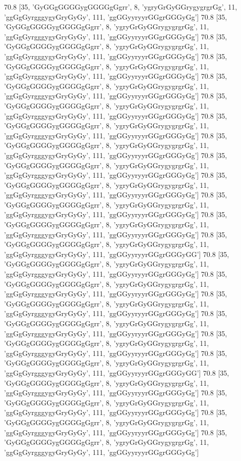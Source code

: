 70.8 [35, 'GyGGgGGGGygGGGGgGgrr', 8, 'ygryGrGyGGrygygrgrGg', 11, 'ggGgGyrgggygyGryGyGy', 111, 'ggGGyyryyrGGgrGGGyGg']
70.8 [35, 'GyGGgGGGGygGGGGgGgrr', 8, 'ygryGrGyGGrygygrgrGg', 11, 'ggGgGyrgggygyGryGyGy', 111, 'ggGGyyryyrGGgrGGGyGg']
70.8 [35, 'GyGGgGGGGygGGGGgGgrr', 8, 'ygryGrGyGGrygygrgrGg', 11, 'ggGgGyrgggygyGryGyGy', 111, 'ggGGyyryyrGGgrGGGyGg']
70.8 [35, 'GyGGgGGGGygGGGGgGgrr', 8, 'ygryGrGyGGrygygrgrGg', 11, 'ggGgGyrgggygyGryGyGy', 111, 'ggGGyyryyrGGgrGGGyGg']
70.8 [35, 'GyGGgGGGGygGGGGgGgrr', 8, 'ygryGrGyGGrygygrgrGg', 11, 'ggGgGyrgggygyGryGyGy', 111, 'ggGGyyryyrGGgrGGGyGg']
70.8 [35, 'GyGGgGGGGygGGGGgGgrr', 8, 'ygryGrGyGGrygygrgrGg', 11, 'ggGgGyrgggygyGryGyGy', 111, 'ggGGyyryyrGGgrGGGyGg']
70.8 [35, 'GyGGgGGGGygGGGGgGgrr', 8, 'ygryGrGyGGrygygrgrGg', 11, 'ggGgGyrgggygyGryGyGy', 111, 'ggGGyyryyrGGgrGGGyGg']
70.8 [35, 'GyGGgGGGGygGGGGgGgrr', 8, 'ygryGrGyGGrygygrgrGg', 11, 'ggGgGyrgggygyGryGyGy', 111, 'ggGGyyryyrGGgrGGGyGg']
70.8 [35, 'GyGGgGGGGygGGGGgGgrr', 8, 'ygryGrGyGGrygygrgrGg', 11, 'ggGgGyrgggygyGryGyGy', 111, 'ggGGyyryyrGGgrGGGyGg']
70.8 [35, 'GyGGgGGGGygGGGGgGgrr', 8, 'ygryGrGyGGrygygrgrGg', 11, 'ggGgGyrgggygyGryGyGy', 111, 'ggGGyyryyrGGgrGGGyGg']
70.8 [35, 'GyGGgGGGGygGGGGgGgrr', 8, 'ygryGrGyGGrygygrgrGg', 11, 'ggGgGyrgggygyGryGyGy', 111, 'ggGGyyryyrGGgrGGGyGg']
70.8 [35, 'GyGGgGGGGygGGGGgGgrr', 8, 'ygryGrGyGGrygygrgrGg', 11, 'ggGgGyrgggygyGryGyGy', 111, 'ggGGyyryyrGGgrGGGyGg']
70.8 [35, 'GyGGgGGGGygGGGGgGgrr', 8, 'ygryGrGyGGrygygrgrGg', 11, 'ggGgGyrgggygyGryGyGy', 111, 'ggGGyyryyrGGgrGGGyGG']
70.8 [35, 'GyGGgGGGGygGGGGgGgrr', 8, 'ygryGrGyGGrygygrgrGg', 11, 'ggGgGyrgggygyGryGyGy', 111, 'ggGGyyryyrGGgrGGGyGg']
70.8 [35, 'GyGGgGGGGygGGGGgGgrr', 8, 'ygryGrGyGGrygygrgrGg', 11, 'ggGgGyrgggygyGryGyGy', 111, 'ggGGyyryyrGGgrGGGyGg']
70.8 [35, 'GyGGgGGGGygGGGGgGgrr', 8, 'ygryGrGyGGrygygrgrGg', 11, 'ggGgGyrgggygyGryGyGy', 111, 'ggGGyyryyrGGgrGGGyGg']
70.8 [35, 'GyGGgGGGGygGGGGgGgrr', 8, 'ygryGrGyGGrygygrgrGg', 11, 'ggGgGyrgggygyGryGyGy', 111, 'ggGGyyryyrGGgrGGGyGg']
70.8 [35, 'GyGGgGGGGygGGGGgGgrr', 8, 'ygryGrGyGGrygygrgrGg', 11, 'ggGgGyrgggygyGryGyGy', 111, 'ggGGyyryyrGGgrGGGyGg']
70.8 [35, 'GyGGgGGGGygGGGGgGgrr', 8, 'ygryGrGyGGrygygrgrGg', 11, 'ggGgGyrgggygyGryGyGy', 111, 'ggGGyyryyrGGgrGGGyGG']
70.8 [35, 'GyGGgGGGGygGGGGgGgrr', 8, 'ygryGrGyGGrygygrgrGg', 11, 'ggGgGyrgggygyGryGyGy', 111, 'ggGGyyryyrGGgrGGGyGg']
70.8 [35, 'GyGGgGGGGygGGGGgGgrr', 8, 'ygryGrGyGGrygygrgrGg', 11, 'ggGgGyrgggygyGryGyGy', 111, 'ggGGyyryyrGGgrGGGyGg']
70.8 [35, 'GyGGgGGGGygGGGGgGgrr', 8, 'ygryGrGyGGrygygrgrGg', 11, 'ggGgGyrgggygyGryGyGy', 111, 'ggGGyyryyrGGgrGGGyGg']
70.8 [35, 'GyGGgGGGGygGGGGgGgrr', 8, 'ygryGrGyGGrygygrgrGg', 11, 'ggGgGyrgggygyGryGyGy', 111, 'ggGGyyryyrGGgrGGGyGg']
